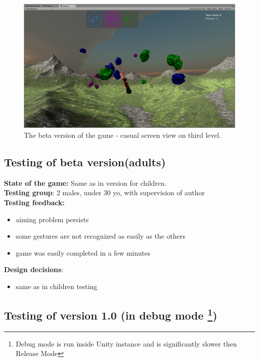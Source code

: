 \begin{figure}
\includegraphics[width=\textwidth]{graphics/screen_v2b.png} 
\caption{The beta version of the game - casual screen view on third level.}
\end{figure}

\subsection{Testing of beta version(adults)}

\textbf{State of the game:} Same as in version for children.
\\
\textbf{Testing group}: 2 males, under 30 yo, with supervision of author
\\
\textbf{Testing feedback:}
\begin{itemize}
\item aiming problem persists
\item some gestures are not recognized as easily as the others
\item game was easily completed in a few minutes
\end{itemize}



\textbf{Design decisions}:
\begin{itemize}
\item same as in children testing
\end{itemize}

\subsection[Testing of version 1.0 (in debug mode)]{Testing of version 1.0 (in debug mode \footnote{Debug mode is run inside Unity instance and is significantly slower then Release Mode})}

